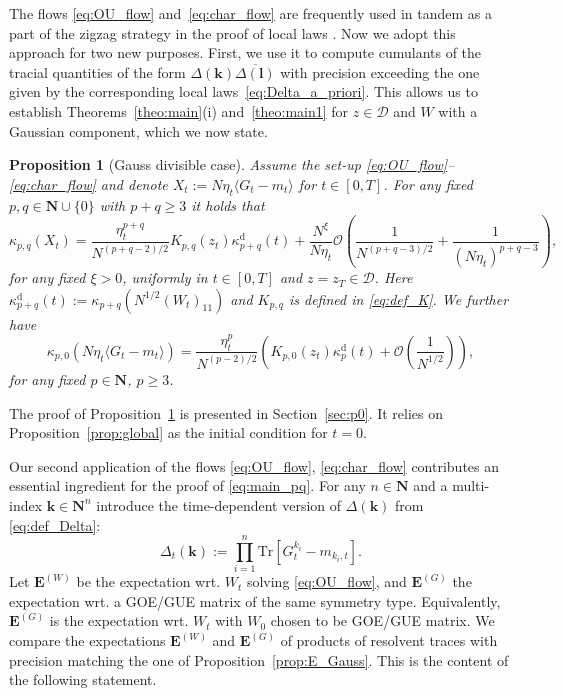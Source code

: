 \documentclass[10pt]{amsart}
\newtheorem{proposition}[theorem]{Proposition}
\numberwithin{equation}{section}
\newcommand{\dif}{\mathrm{d}}
\newcommand{\E}{\mathbf{E}}
\newcommand{\N}{\mathbf{N}}
\begin{document}
The flows \eqref{eq:OU_flow} and~\eqref{eq:char_flow} are frequently used in tandem as a part of the zigzag strategy in the proof of local laws \cite{cipolloni2024out, Cipolloni_meso, cipolloni2023eigenstate}. Now we adopt this approach for  two new purposes. First, we use it to compute cumulants of the tracial quantities of the form $\Delta(\bm{k})\overline{\Delta(\bm{l})}$ with precision exceeding the one given by the corresponding local laws~\eqref{eq:Delta_a_priori}. This allows us to establish Theorems~\ref{theo:main}(i) and~\ref{theo:main1} for $z\in\mathcal{D}$ and $W$ with a Gaussian component, which we now state.

\begin{proposition}[Gauss divisible case]\label{prop:kappa_local} Assume the set-up \eqref{eq:OU_flow}--\eqref{eq:char_flow} and denote $X_t:=N\eta_t\langle G_t-m_t\rangle$ for $t\in [0,T]$. For any fixed $p,q\in\N\cup\{0\}$ with $p+q\ge 3$ it holds that
\begin{equation}
\kappa_{p,q}\left(X_t\right) = \frac{\eta_t^{p+q}}{N^{(p+q-2)/2}}K_{p,q}(z_t)\kappa_{p+q}^{\mathrm{d}}(t) + \frac{N^\xi}{N\eta_t} \mathcal{O}\left( \frac{1}{N^{(p+q-3)/2}}+ \frac{1}{(N\eta_t)^{p+q-3}}\right),
\label{eq:kappapq_local}
\end{equation}
for any fixed $\xi>0$, uniformly in $t\in [0,T]$ and $z=z_T\in\mathcal{D}$. Here $\kappa^\dif_{p+q}(t):=\kappa_{p+q}\left(N^{1/2} (W_t)_{11}\right)$ and $K_{p,q}$ is defined in \eqref{eq:def_K}. We further have
\begin{equation}
\kappa_{p,0}\left(N\eta_t\langle G_t-m_t\rangle\right) = \frac{\eta_t^p}{N^{(p-2)/2}}\left(K_{p,0}(z_t)\kappa_p^{\mathrm{d}}(t) + \mathcal{O}\left(\frac{1}{N^{1/2}}\right)\right),
\label{eq:main_p0_local}
\end{equation}
for any fixed $p\in\N$, $p\ge 3$.  
\end{proposition}

The proof of Proposition~\ref{prop:kappa_local} is presented in Section~\ref{sec:p0}. It relies on Proposition~\ref{prop:global} as  the initial condition for $t=0$. 

Our second application of the flows \eqref{eq:OU_flow}, \eqref{eq:char_flow} contributes an essential ingredient for the proof of \eqref{eq:main_pq}. For any $n\in\N$ and a multi-index $\bm{k}\in\N^n$ introduce the time-dependent version of $\Delta(\bm{k})$ from \eqref{eq:def_Delta}:
\begin{equation}
\Delta_t(\bm{k}):=\prod_{i=1}^n \mathrm{Tr}\left[ G^{k_i}_t-m_{k_i,t}\right].
\end{equation}
Let $\E^{(W)}$ be the expectation wrt. $W_t$ solving \eqref{eq:OU_flow}, and $\E^{(G)}$ the expectation wrt. a GOE/GUE matrix of the same symmetry type. Equivalently, $\E^{(G)}$ is the expectation wrt. $W_t$ with $W_0$ chosen to be GOE/GUE matrix. We compare the expectations $\E^{(W)}$ and $\E^{(G)}$ of products of resolvent traces with precision matching the one of Proposition~\ref{prop:E_Gauss}. This is the content of the following statement.
\end{document}
